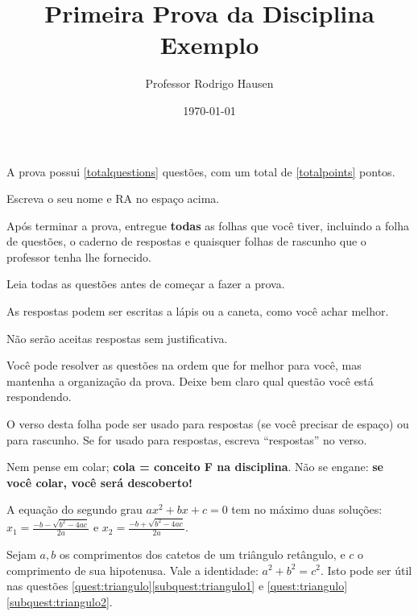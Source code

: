 \documentclass[addpoints,11pt]{provaufabc}
\title{Primeira Prova da Disciplina Exemplo}
\date{\today}
\author{Professor Rodrigo Hausen}
\begin{document}
\vspace*{-1cm}

\makeheader

\begin{instructions}
\item A prova possui \ref{totalquestions} questões, com um
      total de \ref{totalpoints} pontos.
\item Escreva o seu nome e RA no espaço acima.
\item Após terminar a prova, entregue \textbf{todas} as folhas
      que você tiver, incluindo a folha de questões, o caderno
      de respostas e quaisquer folhas de rascunho que o
      professor tenha lhe fornecido.
\item Leia todas as questões antes de começar a fazer a prova.
\item As respostas podem ser escritas a lápis ou a caneta, como
      você achar melhor.
\item Não serão aceitas respostas sem justificativa.
\item Você pode resolver as questões na ordem que for melhor
      para você, mas mantenha a organização da prova. Deixe bem
      claro qual questão você está respondendo.
\item O verso desta folha pode ser usado para respostas (se
      você precisar de espaço) ou para rascunho. Se for usado
      para respostas, escreva ``respostas'' no verso.
\item Nem pense em colar; \textbf{cola = conceito F na
      disciplina}. Não se engane: \textbf{se você colar, você
      será descoberto!}
\end{instructions}

\begin{cheatsheet}
\sloppy
\item A equação do segundo grau $ax^2 + bx + c = 0$ tem no
      máximo duas soluções:
      $\displaystyle x_1 = \frac{-b - \sqrt{b^2 - 4ac}}{2a}$ e
      $\displaystyle x_2 = \frac{-b + \sqrt{b^2 - 4ac}}{2a}$.

\item Sejam $a, b$ os comprimentos dos catetos de um triângulo
      retângulo, e $c$ o comprimento de sua hipotenusa. Vale a
      identidade: $a^2 + b^2 = c^2$. Isto pode ser útil
      nas questões \ref{quest:triangulo}\ref{subquest:triangulo1}
      e \ref{quest:triangulo}\ref{subquest:triangulo2}.
\end{cheatsheet}
\end{document}
